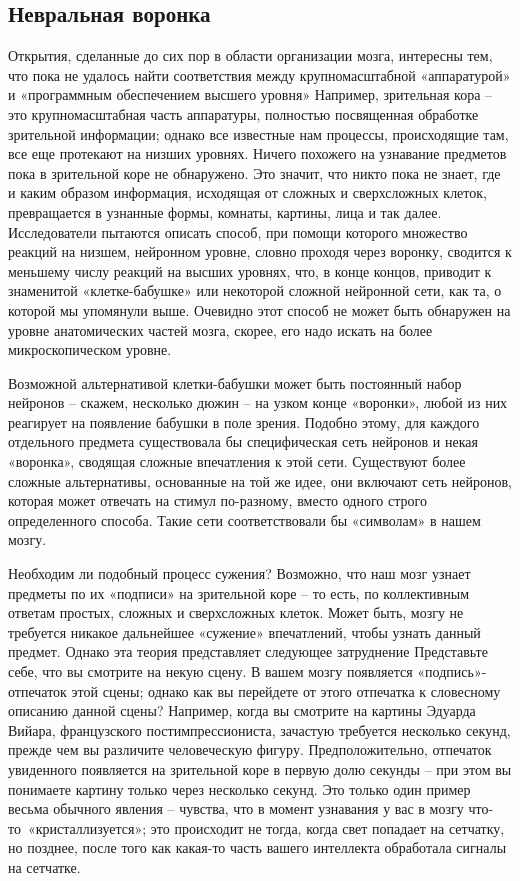 \documentclass[../main.tex]{subfiles}
\begin{document}
\subsection{Невральная воронка}

Открытия, сделанные до сих пор в области организации мозга, интересны тем, что пока не удалось найти соответствия между крупномасштабной «аппаратурой» и «программным обеспечением высшего уровня» Например, зрительная кора \--- это крупномасштабная часть аппаратуры, полностью посвященная обработке зрительной информации; однако все известные нам процессы, происходящие там, все еще протекают на низших уровнях. Ничего похожего на узнавание предметов пока в зрительной коре не обнаружено. Это значит, что никто пока не знает, где и каким образом информация, исходящая от сложных и сверхсложных клеток, превращается в узнанные формы, комнаты, картины, лица и так далее. Исследователи пытаются описать способ, при помощи которого множество реакций на низшем, нейронном уровне, словно проходя через воронку, сводится к меньшему числу реакций на высших уровнях, что, в конце концов, приводит к знаменитой «клетке-бабушке» или некоторой сложной нейронной сети, как та, о которой мы упомянули выше. Очевидно этот способ не может быть обнаружен на уровне анатомических частей мозга, скорее, его надо искать на более микроскопическом уровне.

Возможной альтернативой клетки-бабушки может быть постоянный набор нейронов \--- скажем, несколько дюжин \--- на узком конце «воронки», любой из них реагирует на появление бабушки в поле зрения. Подобно этому, для каждого отдельного предмета существовала бы специфическая сеть нейронов и некая «воронка», сводящая сложные впечатления к этой сети. Существуют более сложные альтернативы, основанные на той же идее, они включают сеть нейронов, которая может отвечать на стимул по-разному, вместо одного строго определенного способа. Такие сети соответствовали бы «символам» в нашем мозгу.

Необходим ли подобный процесс сужения? Возможно, что наш мозг узнает предметы по их «подписи» на зрительной коре \--- то есть, по коллективным ответам простых, сложных и сверхсложных клеток. Может быть, мозгу не требуется никакое дальнейшее «сужение» впечатлений, чтобы узнать данный предмет. Однако эта теория представляет следующее затруднение Представьте себе, что вы смотрите на некую сцену. В вашем мозгу появляется «подпись»-отпечаток этой сцены; однако как вы перейдете от этого отпечатка к словесному описанию данной сцены? Например, когда вы смотрите на картины Эдуарда Вийара, французского постимпрессиониста, зачастую требуется несколько секунд, прежде чем вы различите человеческую фигуру. Предположительно, отпечаток увиденного появляется на зрительной коре в первую долю секунды \--- при этом вы понимаете картину только через несколько секунд. Это только один пример весьма обычного явления \--- чувства, что в момент узнавания у вас в мозгу что-то~«кристаллизуется»; это происходит не тогда, когда свет попадает на сетчатку, но позднее, после того как какая-то часть вашего интеллекта обработала сигналы на сетчатке.
\end{document}
